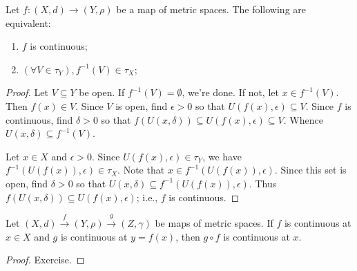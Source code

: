     \begin{proposition}
        Let $f:(X,d) \rightarrow (Y,\rho)$ be a map of metric spaces. The following are equivalent:
            \begin{enumerate}[label = (\arabic*),itemsep=1pt,topsep=3pt]
                \item $f$ is continuous;
                \item $(\forall V \in \tau_Y),f^{-1}(V) \in \tau_X$;
            \end{enumerate}
    \end{proposition}
        \begin{proof}
            Let $V \subseteq Y$ be open. If $f^{-1}(V) = \emptyset$, we're done. If not, let $x \in f^{-1}(V)$. Then $f(x) \in V$. Since $V$ is open, find $\epsilon > 0$ so that $U(f(x),\epsilon) \subseteq V$. Since $f$ is continuous, find $\delta > 0$ so that $f(U(x,\delta)) \subseteq U(f(x),\epsilon) \subseteq V$. Whence $U(x,\delta) \subseteq f^{-1}(V)$.

            Let $x \in X$ and $\epsilon > 0$. Since $U(f(x),\epsilon) \in \tau_Y$, we have $f^{-1}(U(f(x)),\epsilon) \in \tau_X$. Note that $x \in f^{-1}(U(f(x)),\epsilon)$. Since this set is open, find $\delta > 0$ so that $U(x,\delta) \subseteq f^{-1}(U(f(x)),\epsilon)$. Thus $f(U(x,\delta)) \subseteq U(f(x),\epsilon)$; i.e., $f$ is continuous.
        \end{proof}

    \begin{proposition}
        Let $(X,d) \xrightarrow{f} (Y,\rho) \xrightarrow{g} (Z,\gamma)$ be maps of metric spaces. If $f$ is continuous at $x \in X$ and $g$ is continuous at $y = f(x)$, then $g \circ f$ is continuous at $x$.
    \end{proposition}
        \begin{proof}
            Exercise.
        \end{proof}

